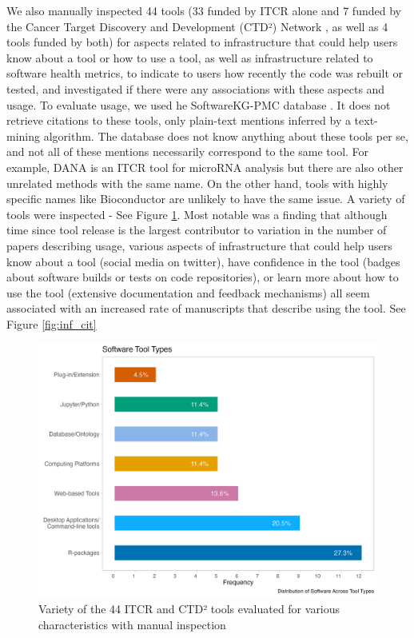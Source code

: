 \documentclass{article}
\begin{document}
We also manually inspected 44 tools (33 funded by ITCR alone and 7 funded by the Cancer Target Discovery and Development (CTD²) Network \cite{aksoy_ctd2_2017}, as well as 4 tools funded by both) for aspects related to infrastructure that could help users know about a tool or how to use a tool, as well as infrastructure related to software health metrics, to indicate to users how recently the code was rebuilt or tested,  and investigated if there were any associations with these aspects and usage. To evaluate usage, we used he SoftwareKG-PMC database \cite{Kruger_usage_20}. It does not retrieve citations to these tools, only plain-text mentions inferred by a text-mining algorithm. The database does not know anything about these tools per se, and not all of these mentions necessarily correspond to the same tool. For example, DANA is an ITCR tool for microRNA analysis but there are also other unrelated methods with the same name. On the other hand, tools with highly specific names like Bioconductor are unlikely to have the same issue. A variety of tools were inspected - See Figure \ref{fig:tool_eval}. Most notable was a finding that although time since tool release is the largest contributor to variation in the number of papers describing usage, various aspects of infrastructure that could help users know about a tool (social media on twitter), have confidence in the tool (badges about software builds or tests on code repositories), or learn more about how to use the tool (extensive documentation and feedback mechanisms) all seem associated with an increased rate of manuscripts that describe using the tool. See Figure \ref{fig:inf_cit}

\begin{figure}[ht] 
    \centering
\includegraphics[width=\textwidth,height=\textheight,keepaspectratio]{images/software_tool_types.png}
    \caption{Variety of the 44 ITCR and CTD² tools evaluated for various characteristics with manual inspection}
    \label{fig:tool_eval}
\end{figure}
\end{document}
